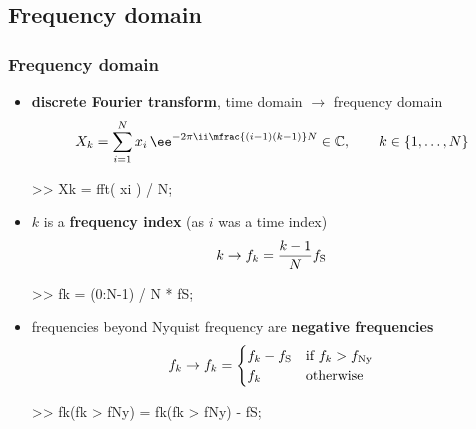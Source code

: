 
\subsection{Frequency domain}

\begin{frame}[fragile]
	\frametitle{Frequency domain}
	\begin{itemize}
		\item \textbf{discrete Fourier transform}, time domain $\rightarrow$ frequency domain
			\begin{align*}
				X_k=\sum_{i=1}^Nx_i\,\ee^{-2\pi\ii\mfrac{(i-1)(k-1)}N}\in\mathbb C,\qquad k\in\{1,\ldots,N\}
			\end{align*}
			\begin{code}
>> Xk = fft( xi ) / N; \color{medium}%
			\end{code}
		\item $k$ is a \textbf{frequency index} (as $i$ was a time index)
			\begin{align*}
				k\rightarrow f_k=\frac{k-1}Nf_{\textrm S}
			\end{align*}
			\begin{code}
>> fk = (0:N-1) / N * fS; \color{medium}%
			\end{code}
		\item frequencies beyond Nyquist frequency are \textbf{negative frequencies}
			\begin{align*}
				f_k\rightarrow f_k=\begin{cases}f_k-f_{\textrm S}&\textrm{if $f_k>f_{\textrm{Ny}}$}\\f_k&\textrm{otherwise}\end{cases}
			\end{align*}
			\begin{code}
>> fk(fk > fNy) = fk(fk > fNy) - fS; \color{medium}%
			\end{code}
	\end{itemize}
\end{frame}

